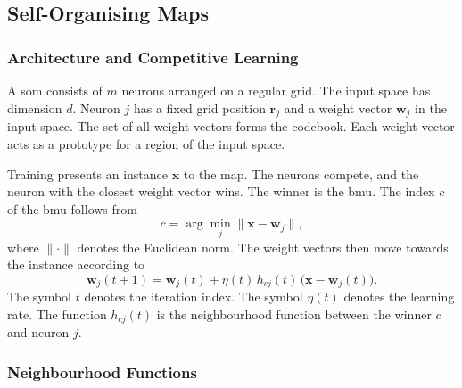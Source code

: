 \documentclass[conference]{IEEEtran}
\newcommand{\vect}[1]{\mathbf{#1}}
\begin{document}
\subsection{Self-Organising Maps}
\label{sub:som}
\subsubsection{Architecture and Competitive Learning}

A \gls{som} consists of $m$ neurons arranged on a regular grid.
The input space has dimension $d$.
Neuron $j$ has a fixed grid position $\vect{r}_j$ and a weight vector $\vect{w}_j$ in the input space.
The set of all weight vectors forms the codebook.
Each weight vector acts as a prototype for a region of the input space.

Training presents an instance $\vect{x}$ to the map.
The neurons compete, and the neuron with the closest weight vector wins.
The winner is the \gls{bmu}.
The index $c$ of the \gls{bmu} follows from
\begin{equation}
c = \arg\min_{j} \lVert \vect{x} - \vect{w}_j \rVert ,
\label{eq:bmu}
\end{equation}
where $\lVert \cdot \rVert$ denotes the Euclidean norm.
The weight vectors then move towards the instance according to
\begin{equation}
\vect{w}_j(t+1) = \vect{w}_j(t) + \eta(t)\, h_{cj}(t)\, \bigl(\vect{x} - \vect{w}_j(t)\bigr) .
\label{eq:update}
\end{equation}
The symbol $t$ denotes the iteration index.
The symbol $\eta(t)$ denotes the learning rate.
The function $h_{cj}(t)$ is the neighbourhood function between the winner $c$ and neuron $j$.

\subsubsection{Neighbourhood Functions}
\end{document}
